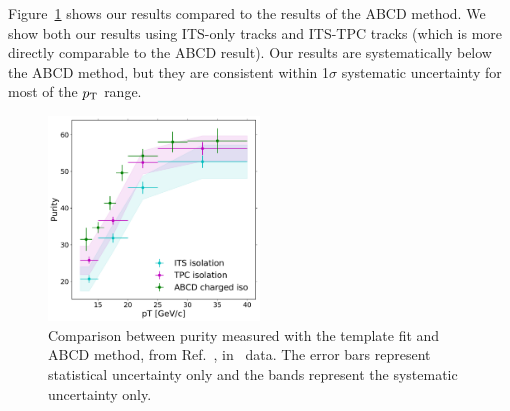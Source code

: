 Figure~\ref{fig:ComparisonToErwanns} shows our results compared to the results of the ABCD method. We show both our results using ITS-only tracks and ITS-TPC tracks (which is more directly comparable to the ABCD result). Our results are systematically below the ABCD method, but they are consistent within 1$\sigma$ systematic uncertainty for most of the $p_{\mathrm{T}}$ range. 


\begin{figure}[h]
\center
\includegraphics[width=0.5\textwidth]{Appendices/ABCDcomparison.pdf}
\caption{Comparison between purity measured with the template fit and ABCD method, from Ref.~\cite{Erwann}, in \pPb~data. The error bars represent statistical uncertainty only and the bands represent the systematic uncertainty only.}
\label{fig:ComparisonToErwanns}
\end{figure}



